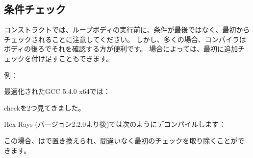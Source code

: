 ﻿\subsection{条件チェック}

コンストラクトでは、ループボディの実行前に、条件が最後ではなく、最初からチェックされることに注意してください。 
しかし、多くの場合、コンパイラはボディの後ろでそれを確認する方が便利です。 
場合によっては、最初に追加チェックを付け足すこともできます。

例：



最適化されたGCC 5.4.0 x64では：



checkを2つ見てきました。

Hex-Rays (バージョン2.2.0より後)では次のようにデコンパイルします：



この場合、はで置き換えられ、間違いなく最初のチェックを取り除くことができます。
